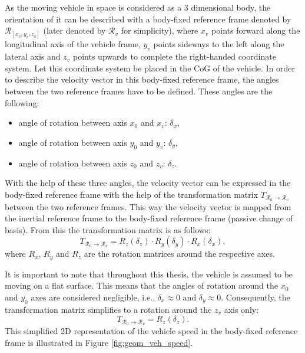 As the moving vehicle in space is considered as a 3 dimensional body, the orientation of it can be described with a body-fixed reference frame denoted by $\mathcal{R}_{[x_v, y_v, z_v]}$ (later denoted by $\mathcal{R}_v$ for simplicity), where $x_v$ points forward along the longitudinal axis of the vehicle frame, $y_v$ points sideways to the left along the lateral axis and $z_v$ points upwards to complete the right-handed coordinate system. Let this coordinate system be placed in the CoG of the vehicle. In order to describe the velocity vector in this body-fixed reference frame, the angles between the two reference frames have to be defined. These angles are the following:
\begin{itemize}
    \item angle of rotation between axis $x_0$ and $x_v$: $\delta_{x}$,
    \item angle of rotation between axis $y_0$ and $y_v$: $\delta_{y}$,
    \item angle of rotation between axis $z_0$ and $z_v$: $\delta_{z}$.
\end{itemize}
With the help of these three angles, the velocity vector can be expressed in the body-fixed reference frame with the help of the transformation matrix $T_{\mathcal{R}_0 \rightarrow{} \mathcal{R}_v}$ between the two reference frames. This way the velocity vector is mapped from the inertial reference frame to the body-fixed reference frame (passive change of basis). From this the transformation matrix is as follows:
\begin{equation}
    T_{\mathcal{R}_0 \rightarrow{} \mathcal{R}_v} = R_z(\delta_{z}) \cdot R_y(\delta_{y}) \cdot R_x(\delta_{x}), 
\end{equation}
where $R_x$, $R_y$ and $R_z$ are the rotation matrices around the respective axes.

It is important to note that throughout this thesis, the vehicle is assumed to be moving on a flat surface. This means that the angles of rotation around the $x_0$ and $y_0$ axes are considered negligible, i.e., $\delta_{x} \approx 0$ and $\delta_{y} \approx 0$. Consequently, the transformation matrix simplifies to a rotation around the $z_v$ axis only:
\begin{equation}
    T_{\mathcal{R}_0 \rightarrow{} \mathcal{R}_v} = R_z(\delta_{z}).
\end{equation}
This simplified 2D representation of the vehicle speed in the body-fixed reference frame is illustrated in Figure \ref{fig:geom_veh_speed}.

